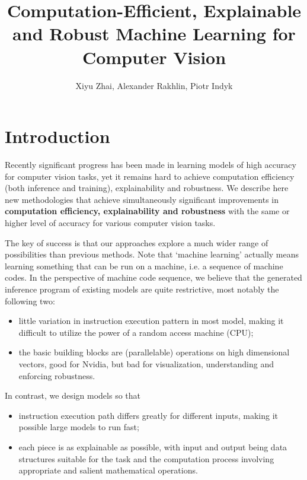 \documentclass[10pt, oneside]{article}   	%
\title{Computation-Efficient, Explainable and Robust Machine Learning for Computer Vision}
\author{Xiyu Zhai, Alexander Rakhlin, Piotr Indyk}
\date{}							%
\theoremstyle{definition}
\begin{document}
\maketitle
\tableofcontents
{}

\section{Introduction}

Recently significant progress has been made in learning models of high accuracy for computer vision tasks, yet it remains hard to achieve computation efficiency (both inference and training), explainability and robustness.
We describe here new methodologies that achieve simultaneously significant improvements in \textbf{computation efficiency, explainability and robustness} with the same or higher level of accuracy for various computer vision tasks.

The key of success is that our approaches explore a much wider range of possibilities than previous methods. Note that `machine learning' actually means learning something that can be run on a machine, i.e. a sequence of machine codes. In the perspective of machine code sequence, we believe that the generated inference program of existing models are quite restrictive, most notably the following two:
\begin{itemize}
	\item little variation in instruction execution pattern in most model, making it difficult to utilize the power of a random access machine (CPU);
	\item the basic building blocks are (parallelable) operations on high dimensional vectors, good for Nvidia, but bad for visualization, understanding and enforcing robustness.
\end{itemize}

In contrast, we design models so that
\begin{itemize}
	\item instruction execution path differs greatly for different inputs, making it possible large models to run fast;
	\item each piece is as explainable as possible, with input and output being data structures suitable for the task and the computation process involving appropriate and salient mathematical operations.
\end{itemize}
\end{document}
